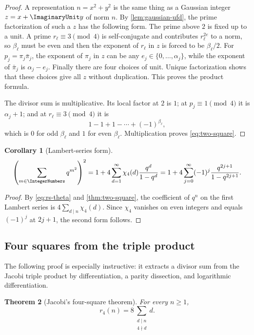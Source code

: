 \documentclass[11pt,oneside]{article}
\newtheorem{theorem}{Theorem}[section]
\newtheorem{corollary}[theorem]{Corollary}
\theoremstyle{definition}
\begin{document}
\begin{proof}
A representation $n=x^2+y^2$ is the same thing as a Gaussian integer
$z=x+\ImaginaryUnit y$ of norm $n$.  By \cref{lem:gaussian-ufd}, the prime
factorization of such a $z$ has the following form.  The prime above $2$
is fixed up to a unit.  A prime $r_\ell\equiv3\pmod4$ is self-conjugate and
contributes $r_\ell^{2e}$ to a norm, so $\beta_\ell$ must be even and then
the exponent of $r_\ell$ in $z$ is forced to be $\beta_\ell/2$.  For
$p_j=\pi_j\bar\pi_j$, the exponent of $\pi_j$ in $z$ can be any
$e_j\in\{0,\ldots,\alpha_j\}$, while the exponent of $\bar\pi_j$ is
$\alpha_j-e_j$.  Finally there are four choices of unit.  Unique
factorization shows that these choices give all $z$ without duplication.
This proves the product formula.

The divisor sum is multiplicative.  Its local factor at $2$ is $1$; at
$p_j\equiv1\pmod4$ it is $\alpha_j+1$; and at
$r_\ell\equiv3\pmod4$ it is
\[
 1-1+1-\cdots+(-1)^{\beta_\ell},
\]
which is $0$ for odd $\beta_\ell$ and $1$ for even $\beta_\ell$.
Multiplication proves \eqref{eq:two-square}.
\end{proof}

\begin{corollary}[Lambert-series form]\label{cor:two-square-lambert}
\begin{equation}\label{eq:two-square-lambert}
 \left(\sum_{m\in\IntegerNumbers}q^{m^2}\right)^2
 =1+4\sum_{d=1}^{\infty}\chi_4(d)\frac{q^d}{1-q^d}
 =1+4\sum_{j=0}^{\infty}(-1)^j
       \frac{q^{2j+1}}{1-q^{2j+1}}.
\end{equation}
\end{corollary}

\begin{proof}
By \eqref{eq:rs-theta} and \cref{thm:two-square}, the coefficient of $q^n$
on the first Lambert series is
$4\sum_{d\mid n}\chi_4(d)$.  Since $\chi_4$ vanishes on even integers and
equals $(-1)^j$ at $2j+1$, the second form follows.
\end{proof}

\subsection{Four squares from the triple product}

The following proof is especially instructive: it extracts a divisor sum
from the Jacobi triple product by differentiation, a parity dissection,
and logarithmic differentiation.

\begin{theorem}[Jacobi's four-square theorem]\label{thm:four-square}
For every $n\ge1$,
\begin{equation}\label{eq:four-square}
 r_4(n)=8\sum_{\substack{d\mid n\\4\nmid d}}d.
\end{equation}
\end{theorem}
\end{document}
